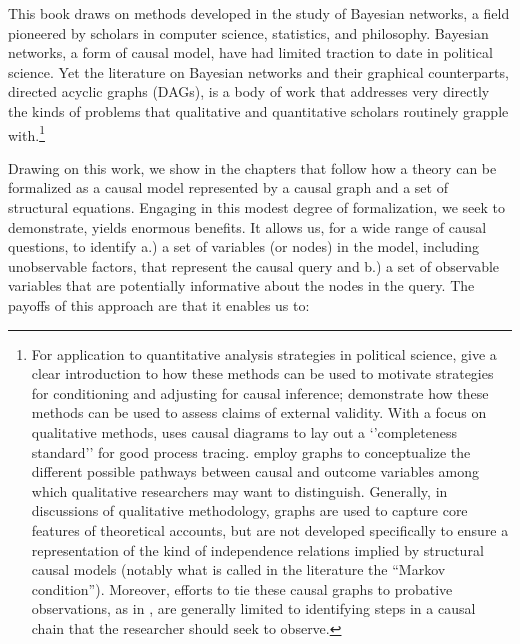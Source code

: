 \documentclass[12pt,]{book}
\let\rmarkdownfootnote\footnote%
\def\footnote{\protect\rmarkdownfootnote}
\begin{document}
This book draws on methods developed in the study of Bayesian networks, a field pioneered by scholars in computer science, statistics, and philosophy. Bayesian networks, a form of causal model, have had limited traction to date in political science. Yet the literature on Bayesian networks and their graphical counterparts, directed acyclic graphs (DAGs), is a body of work that addresses very directly the kinds of problems that qualitative and quantitative scholars routinely grapple with.\footnote{For application to quantitative analysis strategies in political science, \citet{glynn2007non} give a clear introduction to how these methods can be used to motivate strategies for conditioning and adjusting for causal inference; \citet{garcia2015graphical} demonstrate how these methods can be used to assess claims of external validity. With a focus on qualitative methods, \citet{Waldner2015completeness} uses causal diagrams to lay out a `'completeness standard'' for good process tracing. \citet{weller2014finding} employ graphs to conceptualize the different possible pathways between causal and outcome variables among which qualitative researchers may want to distinguish. Generally, in discussions of qualitative methodology, graphs are used to capture core features of theoretical accounts, but are not developed specifically to ensure a representation of the kind of independence relations implied by structural causal models (notably what is called in the literature the ``Markov condition''). Moreover, efforts to tie these causal graphs to probative observations, as in \citet{Waldner2015completeness}, are generally limited to identifying steps in a causal chain that the researcher should seek to observe.}

Drawing on this work, we show in the chapters that follow how a theory can be formalized as a causal model represented by a causal graph and a set of structural equations. Engaging in this modest degree of formalization, we seek to demonstrate, yields enormous benefits. It allows us, for a wide range of causal questions, to identify a.) a set of variables (or nodes) in the model, including unobservable factors, that represent the causal query and b.) a set of observable variables that are potentially informative about the nodes in the query. The payoffs of this approach are that it enables us to:
\end{document}
